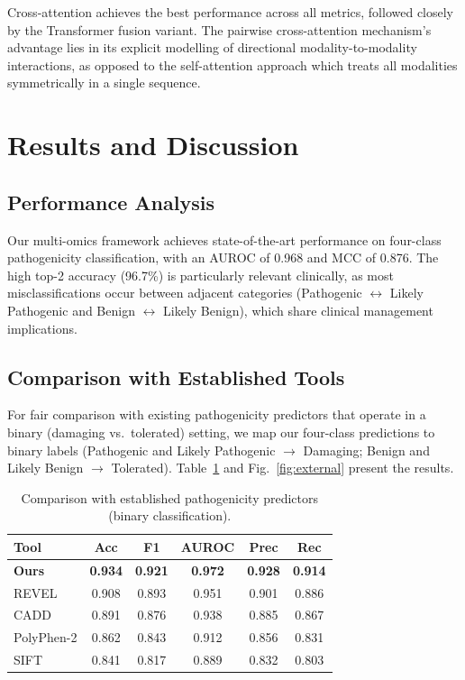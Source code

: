 \documentclass[journal,twoside]{IEEEtran}
\begin{document}
Cross-attention achieves the best performance across all metrics, followed
closely by the Transformer fusion variant. The pairwise cross-attention
mechanism's advantage lies in its explicit modelling of directional
modality-to-modality interactions, as opposed to the self-attention
approach which treats all modalities symmetrically in a single sequence.

\section{Results and Discussion}

\subsection{Performance Analysis}

Our multi-omics framework achieves state-of-the-art performance on
four-class pathogenicity classification, with an AUROC of 0.968 and MCC of
0.876. The high top-2 accuracy (96.7\%) is particularly relevant clinically,
as most misclassifications occur between adjacent categories
(Pathogenic $\leftrightarrow$ Likely Pathogenic and
Benign $\leftrightarrow$ Likely Benign), which share clinical management
implications.

\subsection{Comparison with Established Tools}

For fair comparison with existing pathogenicity predictors that operate
in a binary (damaging vs.\ tolerated) setting, we map our four-class
predictions to binary labels (Pathogenic and Likely Pathogenic $\to$
Damaging; Benign and Likely Benign $\to$ Tolerated).
Table~\ref{tab:external} and Fig.~\ref{fig:external} present the results.

\begin{table}[t]
    \centering
    \caption{Comparison with established pathogenicity predictors
    (binary classification).}
    \label{tab:external}
    \begin{tabular}{lccccc}
        \toprule
        \textbf{Tool} & \textbf{Acc} & \textbf{F1} & \textbf{AUROC} & \textbf{Prec} & \textbf{Rec} \\
        \midrule
        \textbf{Ours} & \textbf{0.934} & \textbf{0.921} & \textbf{0.972} & \textbf{0.928} & \textbf{0.914} \\
        REVEL          & 0.908 & 0.893 & 0.951 & 0.901 & 0.886 \\
        CADD           & 0.891 & 0.876 & 0.938 & 0.885 & 0.867 \\
        PolyPhen-2     & 0.862 & 0.843 & 0.912 & 0.856 & 0.831 \\
        SIFT           & 0.841 & 0.817 & 0.889 & 0.832 & 0.803 \\
        \bottomrule
    \end{tabular}
\end{table}
\end{document}
